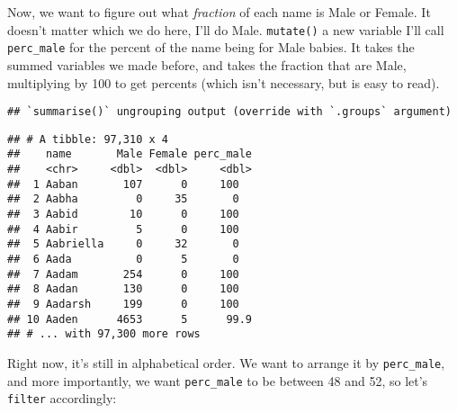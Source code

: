 \documentclass[
]{article}
\newenvironment{Shaded}{\begin{snugshade}}{\end{snugshade}}
\newcommand{\DataTypeTok}[1]{\textcolor[rgb]{0.13,0.29,0.53}{#1}}
\newcommand{\DecValTok}[1]{\textcolor[rgb]{0.00,0.00,0.81}{#1}}
\newcommand{\KeywordTok}[1]{\textcolor[rgb]{0.13,0.29,0.53}{\textbf{#1}}}
\newcommand{\NormalTok}[1]{#1}
\newcommand{\OperatorTok}[1]{\textcolor[rgb]{0.81,0.36,0.00}{\textbf{#1}}}
\newcommand{\StringTok}[1]{\textcolor[rgb]{0.31,0.60,0.02}{#1}}
\begin{document}
Now, we want to figure out what \emph{fraction} of each name is Male or
Female. It doesn't matter which we do here, I'll do Male.
\texttt{mutate()} a new variable I'll call \texttt{perc\_male} for the
percent of the name being for Male babies. It takes the summed variables
we made before, and takes the fraction that are Male, multiplying by 100
to get percents (which isn't necessary, but is easy to read).

\begin{Shaded}
\end{Shaded}

\begin{verbatim}
## `summarise()` ungrouping output (override with `.groups` argument)
\end{verbatim}

\begin{verbatim}
## # A tibble: 97,310 x 4
##    name       Male Female perc_male
##    <chr>     <dbl>  <dbl>     <dbl>
##  1 Aaban       107      0     100  
##  2 Aabha         0     35       0  
##  3 Aabid        10      0     100  
##  4 Aabir         5      0     100  
##  5 Aabriella     0     32       0  
##  6 Aada          0      5       0  
##  7 Aadam       254      0     100  
##  8 Aadan       130      0     100  
##  9 Aadarsh     199      0     100  
## 10 Aaden      4653      5      99.9
## # ... with 97,300 more rows
\end{verbatim}

Right now, it's still in alphabetical order. We want to arrange it by
\texttt{perc\_male}, and more importantly, we want \texttt{perc\_male}
to be between 48 and 52, so let's \texttt{filter} accordingly:
\end{document}
